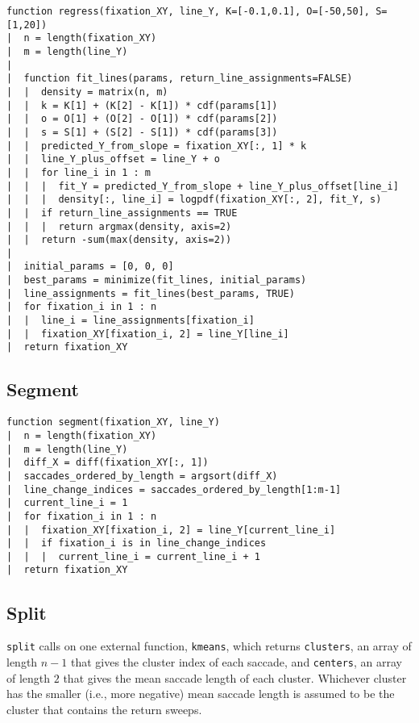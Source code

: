 \documentclass[doc,biblatex]{apa7}
\begin{document}
\begin{verbatim}
function regress(fixation_XY, line_Y, K=[-0.1,0.1], O=[-50,50], S=[1,20])
|  n = length(fixation_XY)
|  m = length(line_Y)
|
|  function fit_lines(params, return_line_assignments=FALSE)
|  |  density = matrix(n, m)
|  |  k = K[1] + (K[2] - K[1]) * cdf(params[1])
|  |  o = O[1] + (O[2] - O[1]) * cdf(params[2])
|  |  s = S[1] + (S[2] - S[1]) * cdf(params[3])
|  |  predicted_Y_from_slope = fixation_XY[:, 1] * k
|  |  line_Y_plus_offset = line_Y + o
|  |  for line_i in 1 : m
|  |  |  fit_Y = predicted_Y_from_slope + line_Y_plus_offset[line_i]
|  |  |  density[:, line_i] = logpdf(fixation_XY[:, 2], fit_Y, s)
|  |  if return_line_assignments == TRUE
|  |  |  return argmax(density, axis=2)
|  |  return -sum(max(density, axis=2))
|
|  initial_params = [0, 0, 0]
|  best_params = minimize(fit_lines, initial_params)
|  line_assignments = fit_lines(best_params, TRUE)
|  for fixation_i in 1 : n
|  |  line_i = line_assignments[fixation_i]
|  |  fixation_XY[fixation_i, 2] = line_Y[line_i]
|  return fixation_XY
\end{verbatim}

\subsection{Segment}

\begin{verbatim}
function segment(fixation_XY, line_Y)
|  n = length(fixation_XY)
|  m = length(line_Y)
|  diff_X = diff(fixation_XY[:, 1])
|  saccades_ordered_by_length = argsort(diff_X)
|  line_change_indices = saccades_ordered_by_length[1:m-1]
|  current_line_i = 1
|  for fixation_i in 1 : n
|  |  fixation_XY[fixation_i, 2] = line_Y[current_line_i]
|  |  if fixation_i is in line_change_indices
|  |  |  current_line_i = current_line_i + 1
|  return fixation_XY
\end{verbatim}

\subsection{Split}

\noindent
\texttt{split} calls on one external function, \texttt{kmeans}, which returns \texttt{clusters}, an array of length $n-1$ that gives the cluster index of each saccade, and \texttt{centers}, an array of length $2$ that gives the mean saccade length of each cluster. Whichever cluster has the smaller (i.e., more negative) mean saccade length is assumed to be the cluster that contains the return sweeps.
\end{document}
